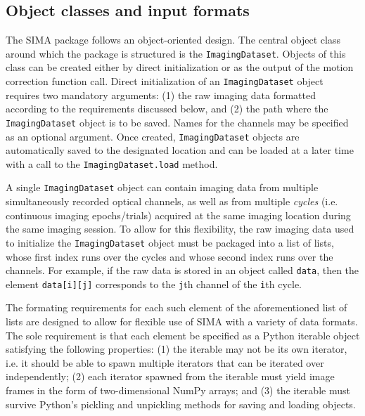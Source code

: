 \subsection{Object classes and input formats}\label{sec:sima:inputs}
The SIMA package follows an object-oriented design.
The central object class around which the package is structured is the \verb|ImagingDataset|.
Objects of this class can be created either by direct initialization
or as the output of the motion correction function call.
Direct initialization of an \verb|ImagingDataset| object requires two mandatory arguments:
(1) the raw imaging data formatted according to the requirements discussed below, 
and (2) the path where the \verb|ImagingDataset| object is to be saved.
Names for the channels may be specified as an optional argument.
Once created, \verb|ImagingDataset| objects are automatically saved to the
designated location and can be loaded at a later time with
a call to the \verb|ImagingDataset.load| method.

A single \verb|ImagingDataset| object can contain imaging data from multiple
simultaneously recorded optical channels, as well as from multiple \textit{cycles} 
(i.e. continuous imaging epochs/trials) acquired at the same imaging location
during the same imaging session.
To allow for this flexibility, the raw imaging data used to initialize the
\verb|ImagingDataset| object must be packaged into a list of lists,
whose first index runs over the cycles and whose second index runs over the
channels.
For example, if the raw data is stored in an object called \verb|data|,
then the element \verb|data[i][j]| corresponds to the \verb|j|th channel of the
\verb|i|th cycle.

The formating requirements for each such element of the aforementioned list of lists
are designed to allow for flexible use of SIMA with
a variety of data formats.
The sole requirement is that each element be specified as a Python iterable
object satisfying the following properties: 
(1) the iterable may not be its own iterator, i.e. it should be able to spawn
multiple iterators that can be iterated over independently;
(2) each iterator spawned from the iterable must yield image frames in the form
of two-dimensional NumPy arrays;
and (3) the iterable must survive Python's pickling and unpickling methods
for saving and loading objects.

